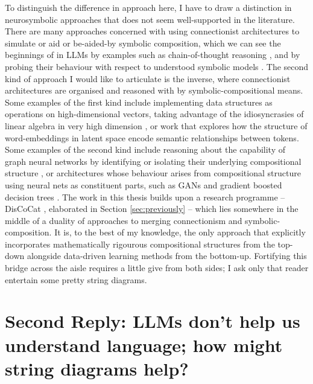 To distinguish the difference in approach here, I have to draw a distinction in neurosymbolic approaches that does not seem well-supported in the literature. There are many approaches concerned with using connectionist architectures to simulate or aid or be-aided-by symbolic composition, which we can see the beginnings of in LLMs by examples such as chain-of-thought reasoning \citep{weiChainofThoughtPromptingElicits2023}, and by probing their behaviour with respect to understood symbolic models \citep{koralusHumansHumansOut2023}. The second kind of approach I would like to articulate is the inverse, where connectionist architectures are organised and reasoned with by symbolic-compositional means. Some examples of the first kind include implementing data structures as operations on high-dimensional vectors, taking advantage of the idiosyncrasies of linear algebra in very high dimension \citep{kanervaComputingHighDimensionalVectors2019}, or work that explores how the structure of word-embeddings in latent space encode semantic relationships between tokens. Some examples of the second kind include reasoning about the capability of graph neural networks by identifying or isolating their underlying compositional structure \citep{liuSeeingBelievingBrainInspired2023}, or architectures whose behaviour arises from compositional structure using neural nets as constituent parts, such as GANs \citep{goodfellowGenerativeAdversarialNetworks2014} and gradient boosted decision trees \citep{chenXGBoostScalableTree2016a}. The work in this thesis builds upon a research programme -- DisCoCat \citep{coeckeMathematicalFoundationsCompositional2010a}, elaborated in Section \ref{sec:previously} -- which lies somewhere in the middle of a duality of approaches to merging connectionism and symbolic-composition. It is, to the best of my knowledge, the only approach that explicitly incorporates mathematically rigourous compositional structures from the top-down alongside data-driven learning methods from the bottom-up. Fortifying this bridge across the aisle requires a little give from both sides; I ask only that reader entertain some pretty string diagrams.

\section{\textbf{Second Reply:} LLMs don't help us understand language; how might string diagrams help?}

